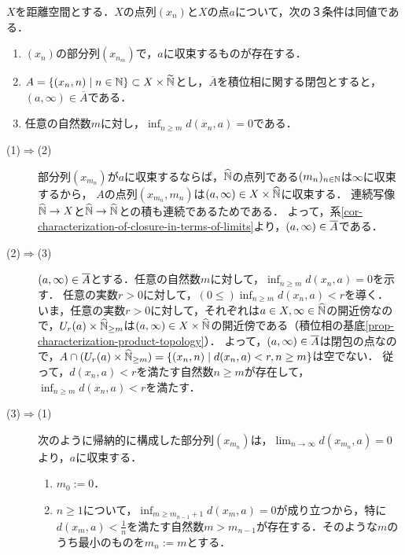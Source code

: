 \documentclass[uplatex,dvipdfmx]{jsreport}
\begin{document}
\begin{lemma}[部分列が収束することの特徴付け]\label{lemma-部分列が収束することの特徴付け}
    $X$を距離空間とする．$X$の点列$(x_n)$と$X$の点$a$について，次の３条件は同値である．
    \begin{enumerate}
        \item $(x_n)$の部分列$(x_{n_m})$で，$a$に収束するものが存在する．
        \item $A=\{(x_n,n)\mid n\in\mathbb{N}\}\subset X\times\widetilde{\mathbb{N}}$とし，$\overline{A}$を積位相に関する閉包とすると，$(a,\infty)\in\overline{A}$である．
        \item 任意の自然数$m$に対し，$\inf_{n\ge m}d(x_n,a)=0$である．
    \end{enumerate}
\end{lemma}
\begin{Proof}\mbox{}
    \begin{description}
        \item[(1)$\Rightarrow$(2)] 
        部分列$(x_{m_n})$が$a$に収束するならば，$\widehat{\mathbb{N}}$の点列である$(m_n)_{n\in\mathbb{N}}$は$\infty$に収束するから，
        $A$の点列$(x_{m_n},m_n)$は$(a,\infty)\in X\times\widehat{\mathbb{N}}$に収束する．
        連続写像$\widehat{\mathbb{N}}\to X$と$\widehat{\mathbb{N}}\to\widehat{\mathbb{N}}$との積も連続であるためである．
        よって，系\ref{cor-characterization-of-closure-in-terms-of-limits}より，$(a,\infty)\in\overline{A}$である．
        \item[(2)$\Rightarrow$(3)]
        $(a,\infty)\in\overline{A}$とする．任意の自然数$m$に対して，$\inf_{n\ge m}d(x_n,a)=0$を示す．
        任意の実数$r>0$に対して，$(0\le)\inf_{n\ge m}d(x_n,a)<r$を導く．
        いま，任意の実数$r>0$に対して，それぞれは$a\in X,\infty\in\widehat{\mathbb{N}}$の開近傍なので，$U_r(a)\times\widehat{\mathbb{N}}_{\ge m}$は$(a,\infty)\in X\times\widehat{\mathbb{N}}$の開近傍である（積位相の基底\ref{prop-characterization-product-topology}）．
        よって，$(a,\infty)\in\overline{A}$は閉包の点なので，$A\cap(U_r(a)\times\widehat{\mathbb{N}}_{\ge m})=\{(x_n,n)\mid d(x_n,a)<r,n\ge m\}$は空でない．
        従って，$d(x_n,a)<r$を満たす自然数$n\ge m$が存在して，$\inf_{n\ge m}d(x_n,a)<r$を満たす．
        \item[(3)$\Rightarrow$(1)]
        次のように帰納的に構成した部分列$(x_{m_n})$は，$\lim_{n\to\infty}d(x_{m_n},a)=0$より，$a$に収束する．
        \begin{enumerate}
            \item $m_0:=0$．
            \item $n\ge 1$について，$\inf_{m\ge m_{n-1}+1}d(x_m,a)=0$が成り立つから，特に$d(x_m,a)<\frac{1}{n}$を満たす自然数$m>m_{n-1}$が存在する．そのような$m$のうち最小のものを$m_n:=m$とする．
        \end{enumerate}
    \end{description}
\end{Proof}
\end{document}
